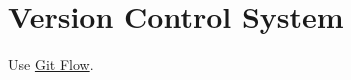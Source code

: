\chapter{Version Control System}
Use \href{http://danielkummer.github.io/git-flow-cheatsheet/}{Git Flow}.


